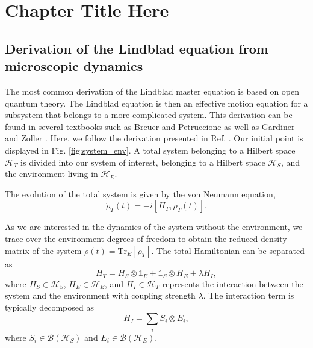 
\chapter{Chapter Title Here} %

\label{ChapterX} %


\section{Derivation of the Lindblad equation from microscopic dynamics}

The most common derivation of the Lindblad master equation is based on open quantum theory. The Lindblad equation is then an effective motion equation for a subsystem that belongs to a more complicated system. This derivation can be found in several textbooks such as Breuer and Petruccione \cite{Breuer2002} as well as Gardiner and Zoller \cite{Gardiner2004}. Here, we follow the derivation presented in Ref. \cite{Lindblad1976}. Our initial point is displayed in Fig. \ref{fig:system_env}. A total system belonging to a Hilbert space $\mathcal{H}_T$ is divided into our system of interest, belonging to a Hilbert space $\mathcal{H}_S$, and the environment living in $\mathcal{H}_E$.

The evolution of the total system is given by the von Neumann equation,
\begin{equation}
    \dot{\rho}_T(t) = -i[H_T, \rho_T(t)].
\end{equation}

As we are interested in the dynamics of the system without the environment, we trace over the environment degrees of freedom to obtain the reduced density matrix of the system $\rho(t) = \mathrm{Tr}_E[\rho_T]$. The total Hamiltonian can be separated as
\begin{equation}
    H_T = H_S \otimes \mathbb{1}_E + \mathbb{1}_S \otimes H_E + \lambda H_I,
\end{equation}
where $H_S \in \mathcal{H}_S$, $H_E \in \mathcal{H}_E$, and $H_I \in \mathcal{H}_T$ represents the interaction between the system and the environment with coupling strength $\lambda$. The interaction term is typically decomposed as
\begin{equation}
    H_I = \sum_i S_i \otimes E_i,
\end{equation}
where $S_i \in \mathcal{B}(\mathcal{H}_S)$ and $E_i \in \mathcal{B}(\mathcal{H}_E)$.

